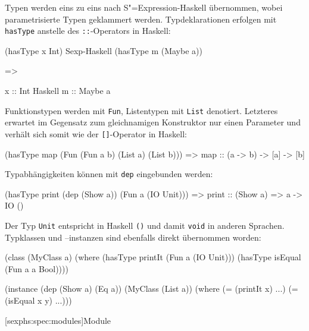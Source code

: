 \documentclass[12pt, a4paper, bibgerm]{scrbook}
\newenvironment{DIFnomarkup}{}{}
\newcommand\icode[1]{\lstinline?#1?}
\newcommand\lsubsection{}
\newcommand{\sexp}{S"=Expression}
\begin{document}
Typen werden eins zu eins nach \sexp{}-Haskell übernommen, wobei
parametrisierte Typen geklammert werden. Typdeklarationen erfolgen
mit \icode{hasType} anstelle des \icode{::}-Operators in Haskell:
\begin{DIFnomarkup}\begin{code}
(hasType x Int)
                                      Sexp-Haskell
(hasType m (Maybe a))

=>

x :: Int
                                      Haskell
m :: Maybe a
\end{code}\end{DIFnomarkup}
Funktionstypen werden mit \icode{Fun}, Listentypen mit \icode{List}
denotiert. Letzteres erwartet im Gegensatz zum gleichnamigen
Konstruktor nur einen Parameter und verhält sich somit wie der
\icode{[]}-Operator in Haskell:
\begin{DIFnomarkup}\begin{code}
(hasType map (Fun (Fun a b) (List a) (List b)))
=>
map :: (a -> b) -> [a] -> [b]                  
\end{code}\end{DIFnomarkup}
Typabhängigkeiten können mit \icode{dep} eingebunden werden:
\begin{DIFnomarkup}\begin{code}
(hasType print (dep (Show a)) (Fun a (IO Unit)))
=>
print :: (Show a) => a -> IO ()
\end{code}\end{DIFnomarkup}
Der Typ \icode{Unit} entspricht in Haskell \icode{()} und damit \icode{void}
in anderen Sprachen. Typklassen und --instanzen sind ebenfalls direkt
übernommen worden:
\begin{DIFnomarkup}\begin{code}
(class 
  (MyClass a)
  (where
    (hasType printIt (Fun a (IO Unit)))
    (hasType isEqual (Fun a a Bool))))

(instance (dep (Show a) (Eq a))
  (MyClass (List a))
  (where
    (= (printIt x)   ...)
    (= (isEqual x y) ...)))
\end{code}\end{DIFnomarkup}

\lsubsection[sexphs:spec:modules]{Module}
\end{document}

